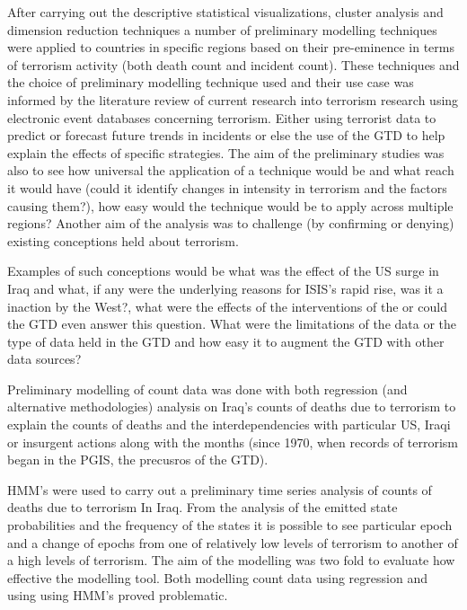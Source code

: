 After carrying out the descriptive statistical visualizations, cluster analysis and dimension reduction techniques a number of preliminary modelling techniques were applied to countries in specific regions based on their pre-eminence in terms of terrorism activity (both death count and incident count). These techniques and the choice of preliminary  modelling technique used and their use case was informed by the literature review of current research into terrorism research using electronic event databases concerning terrorism. Either using terrorist data to predict or forecast future trends in incidents or else the use of the GTD to help explain the effects of specific strategies. The aim of the preliminary studies was also to see how universal the application of a technique would be and what reach it would have (could it identify changes in intensity in terrorism and the factors causing them?), how easy would the technique would be to apply across multiple regions? Another aim of the analysis was to challenge (by confirming or denying) existing conceptions held about terrorism.

Examples of such conceptions would be what was the effect of the US surge in Iraq and what, if any were the underlying reasons for ISIS's rapid rise, was it a inaction by the West?, what were the effects of the interventions of the  or could the GTD even answer this question. What were the limitations of the data or the type of data held in the GTD and how easy it to augment the GTD with other data sources?

Preliminary modelling of count data was done with both regression (and alternative methodologies) analysis on Iraq's counts of deaths due to terrorism to explain the counts of deaths and the interdependencies with particular US, Iraqi or insurgent actions along with the months (since 1970, when records of terrorism began in the PGIS, the precusros of the GTD). 

HMM's were used to carry out a preliminary time series analysis of counts of deaths due to terrorism In Iraq. From the analysis of the emitted state probabilities and the frequency of the states it is possible to see particular epoch and a change of epochs from one of relatively low levels of terrorism to another of a high levels of terrorism. The aim of the modelling was two fold to evaluate how effective the modelling tool. Both modelling count data using regression and using using HMM's proved problematic. 


